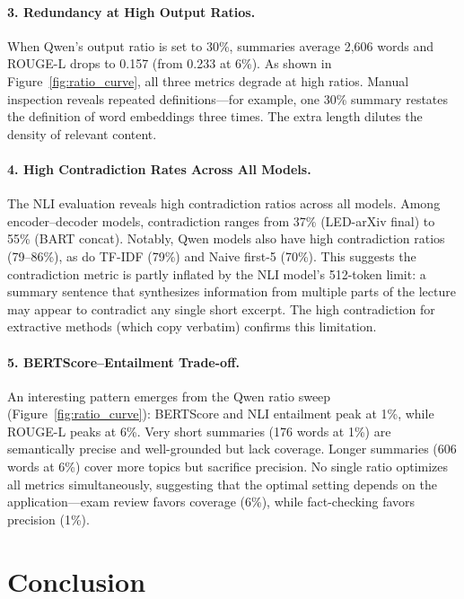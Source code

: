 \paragraph{3. Redundancy at High Output Ratios.}
When Qwen's output ratio is set to 30\%, summaries average 2,606 words and ROUGE-L drops to 0.157 (from 0.233 at 6\%). As shown in Figure~\ref{fig:ratio_curve}, all three metrics degrade at high ratios. Manual inspection reveals repeated definitions---for example, one 30\% summary restates the definition of word embeddings three times. The extra length dilutes the density of relevant content.

\paragraph{4. High Contradiction Rates Across All Models.}
The NLI evaluation reveals high contradiction ratios across all models. Among encoder--decoder models, contradiction ranges from 37\% (LED-arXiv final) to 55\% (BART concat). Notably, Qwen models also have high contradiction ratios (79--86\%), as do TF-IDF (79\%) and Naive first-5 (70\%). This suggests the contradiction metric is partly inflated by the NLI model's 512-token limit: a summary sentence that synthesizes information from multiple parts of the lecture may appear to contradict any single short excerpt. The high contradiction for extractive methods (which copy verbatim) confirms this limitation.

\paragraph{5. BERTScore--Entailment Trade-off.}
An interesting pattern emerges from the Qwen ratio sweep (Figure~\ref{fig:ratio_curve}): BERTScore and NLI entailment peak at 1\%, while ROUGE-L peaks at 6\%. Very short summaries (176 words at 1\%) are semantically precise and well-grounded but lack coverage. Longer summaries (606 words at 6\%) cover more topics but sacrifice precision. No single ratio optimizes all metrics simultaneously, suggesting that the optimal setting depends on the application---exam review favors coverage (6\%), while fact-checking favors precision (1\%).


\section{Conclusion}
\label{sec:conclusion}

